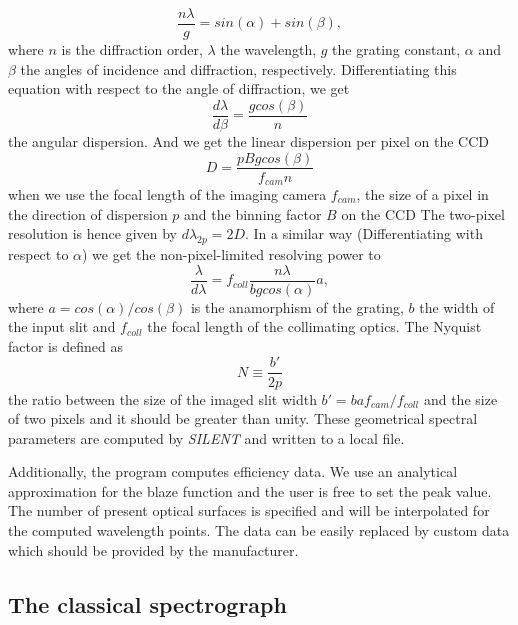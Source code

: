 \documentclass[preprint,12pt,authoryear]{elsarticle}
\begin{document}
\begin{equation}
 \label{Eq1}
 \frac{n \lambda}{g} = sin(\alpha) + sin(\beta),
\end{equation}
where $n$ is the diffraction order, $\lambda$ the wavelength, $g$ the grating constant, $\alpha$ and $\beta$ the angles of incidence and diffraction, respectively.
Differentiating this equation with respect to the angle of diffraction, we get
\begin{equation}
 \label{Eq2}
 \frac{d\lambda}{d\beta}=\frac{g cos(\beta)}{n}
\end{equation}
the angular dispersion. And we get the linear dispersion per pixel on the CCD
\begin{equation}
 \label{Eq3}
 D=\frac{p B g cos(\beta)}{f_{cam} n}
\end{equation}
when we use the focal length of the imaging camera $f_{cam}$, the size of a pixel in the direction of dispersion $p$ and the binning factor $B$ on the CCD
The two-pixel resolution is hence given by $d\lambda_{2p}=2D$. In a similar way (Differentiating with respect to $\alpha$) we get the non-pixel-limited 
resolving power to
\begin{equation}
 \label{Eq4}
 \frac{\lambda}{d\lambda}=f_{coll}\frac{n \lambda}{b g cos(\alpha)}a,
\end{equation}
where $a=cos(\alpha)/cos(\beta)$ is the anamorphism of the grating, $b$ the width of the input slit and $f_{coll}$ the focal length of the collimating optics.
The Nyquist factor is defined as
\begin{equation}
 \label{Eq5}
 N \equiv \frac{b'}{2p}
\end{equation}
the ratio between the size of the imaged slit width $b' = b a f_{cam}/f_{coll}$ and the size of two pixels and it should be greater than unity. These
geometrical spectral parameters are computed by \textit{SILENT} and written to a local file.

Additionally, the program computes efficiency data. We use an analytical approximation for the blaze function and the user is free to set the peak value.
The number of present optical surfaces is specified and will be interpolated for the computed wavelength points. The data can be easily replaced by custom
data which should be provided by the manufacturer.

\subsection{The classical spectrograph}
\end{document}
